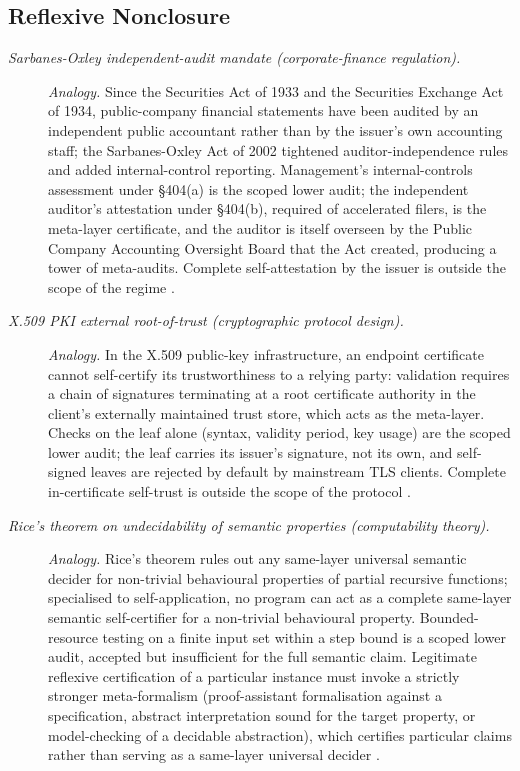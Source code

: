\subsection*{ Reflexive Nonclosure}
\begingroup\small
\begin{description}
\item[\emph{Sarbanes-Oxley independent-audit mandate
(corporate-finance regulation).}] \textit{Analogy.}
Since the Securities Act of 1933 and the Securities Exchange Act of
1934, public-company financial statements have been audited by an
independent public accountant rather than by the issuer's own
accounting staff; the Sarbanes-Oxley Act of 2002 tightened
auditor-independence rules and added internal-control reporting.
Management's internal-controls assessment under \S404(a) is the
scoped lower audit; the independent auditor's attestation under
\S404(b), required of accelerated filers, is the meta-layer
certificate, and the auditor is itself overseen by the Public Company
Accounting Oversight Board that the Act created, producing a tower of
meta-audits.  Complete
self-attestation by the issuer is outside the scope of
the regime \citep{SarbanesOxley2002Act}.

\item[\emph{X.509 PKI external root-of-trust
(cryptographic protocol design).}] \textit{Analogy.}
In the X.509 public-key infrastructure, an endpoint
certificate cannot self-certify its trustworthiness to a
relying party: validation requires a chain of signatures
terminating at a root certificate authority in the
client's externally maintained trust store, which acts
as the meta-layer.  Checks on the leaf alone (syntax, validity period, key
usage) are the scoped lower audit; the leaf carries its issuer's
signature, not its own, and self-signed leaves are rejected by default by
mainstream TLS clients.  Complete in-certificate
self-trust is outside the scope of the protocol
\citep{Cooper2008RFC5280}.

\item[\emph{Rice's theorem on undecidability of semantic
properties (computability theory).}] \textit{Analogy.}
Rice's theorem rules out any same-layer universal
semantic decider for non-trivial behavioural properties
of partial recursive functions; specialised to
self-application, no program can act as a complete
same-layer
semantic self-certifier for a non-trivial behavioural
property.  Bounded-resource testing on a finite input
set within a step bound is a scoped lower audit, accepted
but insufficient for the full semantic claim.  Legitimate
reflexive certification of a particular instance must
invoke a strictly stronger meta-formalism (proof-assistant
formalisation against a specification, abstract
interpretation sound for the target property, or
model-checking of a decidable abstraction), which
certifies particular claims rather than serving as a
same-layer universal decider \citep{Rice1953Classes}.


\end{description}
